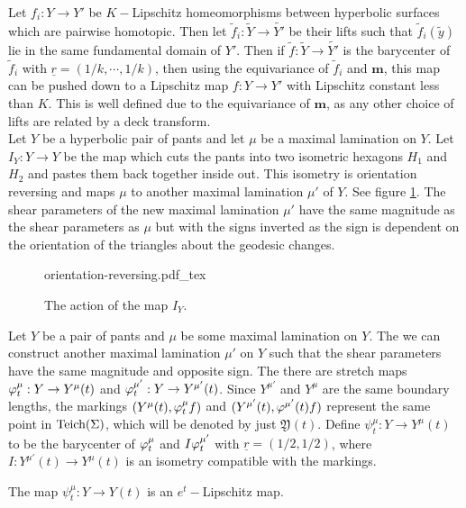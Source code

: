 Let $f_i:Y\to Y'$ be $K-$Lipschitz homeomorphisms between hyperbolic surfaces which are pairwise homotopic. Then let $\tilde{f}_i:\tilde{Y}\to \tilde{Y'}$ be their lifts such that $\tilde{f}_i(\tilde{y})$ lie in the same fundamental domain of $Y'$. Then if $\tilde{f}:\tilde{Y}\to \tilde{Y'}$ is the barycenter of $\tilde{f}_i$ with $\underline{r} = (1/k,\cdots, 1/k)$, then using the equivariance of $\tilde{f}_i$ and $\mathbf{m}$, this map can be pushed down to a Lipschitz map $f:Y\to Y'$ with Lipschitz constant less than $K$. This is well defined due to the equivariance of $\mathbf{m}$, as any other choice of lifts are related by a deck transform.\\

Let $Y$ be a hyperbolic pair of pants and let $\mu$ be a maximal lamination on $Y$. Let $I_Y:Y\to Y$ be the map which cuts the pants into two isometric hexagons $H_1$ and $H_2$ and pastes them back together inside out. This isometry is orientation reversing and maps $\mu$ to another maximal lamination $\mu'$ of $Y$. See figure \ref{fig:orientation-reversing}. The shear parameters of the new maximal lamination $\mu'$ have the same magnitude as the shear parameters as $\mu$ but with the signs inverted as the sign is dependent on the orientation of the triangles about the geodesic changes.
\begin{figure}[h]
\centering
\def\svgwidth{0.8\textwidth}
{orientation-reversing.pdf_tex}
\caption[Orientation reversing map on Pants]{The action of the map $I_Y$.}
\label{fig:orientation-reversing}
\end{figure}
\begin{definition}
  Let $Y$ be a pair of pants and $\mu$ be some maximal lamination on $Y$. The we can construct another maximal lamination $\mu'$ on $Y$ such that the shear parameters have the same magnitude and opposite sign. The there are stretch maps $\varphi^\mu_t:Y\to Y^\mu(t)$ and $\varphi^{\mu'}_t:Y\to Y^{\mu'}(t)$. Since $Y^{\mu'}$ and $Y^\mu$ are the same boundary lengths, the markings $(Y^\mu(t), \varphi^\mu_tf)$ and $(Y^{\mu'}(t),\varphi^{\mu'}(t)f)$ represent the same point in $\text{Teich}(\Sigma)$, which will be denoted by just $ \mathfrak{Y}(t)$. Define $\psi^\mu_t:Y\to Y^\mu(t)$ to be the barycenter of $\varphi_t^\mu$ and $I\varphi_t^{\mu'}$ with $\underline{r} = (1/2,1/2)$, where $I:Y^{\mu'}(t)\to Y^\mu(t)$ is an isometry compatible with the markings. 
\end{definition}
\begin{proposition}
  The map $\psi^\mu_t:Y\to Y(t)$ is an $e^t-$Lipschitz map.
\end{proposition}
